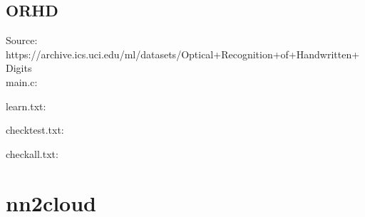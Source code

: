 \subsection{ORHD}

Source: https://archive.ics.uci.edu/ml/datasets/Optical+Recognition+of+Handwritten+Digits \\

main.c:\\
\begin{scriptsize}
\begin{ttfamily}

\end{ttfamily}
\end{scriptsize}

learn.txt:\\
\begin{scriptsize}
\begin{ttfamily}

\end{ttfamily}
\end{scriptsize}

checktest.txt:\\
\begin{scriptsize}
\begin{ttfamily}

\end{ttfamily}
\end{scriptsize}

checkall.txt:\\
\begin{scriptsize}
\begin{ttfamily}

\end{ttfamily}
\end{scriptsize}

\section{nn2cloud}

\begin{scriptsize}
\begin{ttfamily}

\end{ttfamily}
\end{scriptsize}
